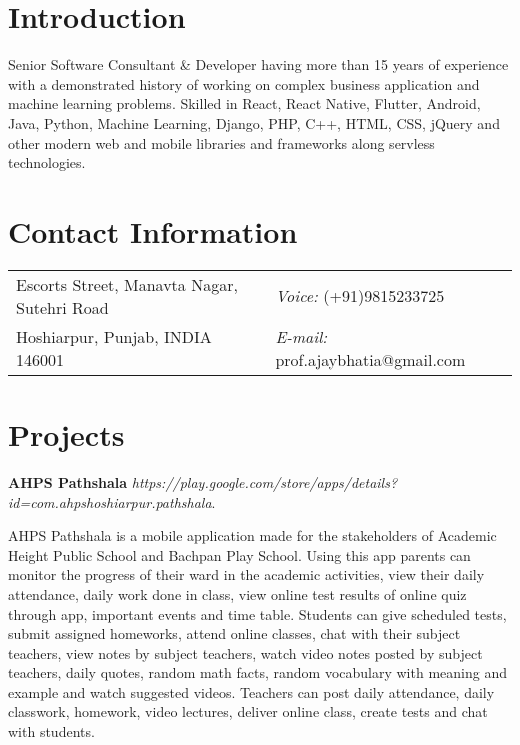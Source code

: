 \documentclass[margin,line]{res}
\begin{document}

\begin{resume}
	
\section{\sc Introduction}
Senior Software Consultant \& Developer having more than 15 years of experience with a demonstrated history of working on complex business application and machine learning problems. Skilled in React, React Native, Flutter, Android, Java, Python, Machine Learning, Django, PHP, C++, HTML, CSS, jQuery and other modern web and mobile libraries and frameworks along servless technologies.
	
\section{\sc Contact Information}
\vspace{.05in}
\begin{tabular}{@{}p{4in}p{4in}}
Escorts Street, Manavta Nagar, Sutehri Road & {\it Voice:}  (+91)9815233725\\
Hoshiarpur, Punjab, INDIA 146001 & {\it E-mail:}  prof.ajaybhatia@gmail.com\\
\end{tabular}

\section{\sc Projects}

\textbf{AHPS Pathshala} {\em https://play.google.com/store/apps/details?id=com.ahpshoshiarpur.pathshala}. 

AHPS Pathshala is a mobile application made for the stakeholders of Academic Height Public School and Bachpan Play School. Using this app parents can monitor the progress of their ward in the academic activities, view their daily attendance, daily work done in class, view online test results of online quiz through app, important events and time table. Students can give scheduled tests, submit assigned homeworks, attend online classes, chat with their subject teachers, view notes by subject teachers, watch video notes posted by subject teachers, daily quotes, random math facts, random vocabulary with meaning and example and watch suggested videos. Teachers can post daily attendance, daily classwork, homework, video lectures, deliver online class, create tests and chat with students. 


\end{resume}
\end{document}
